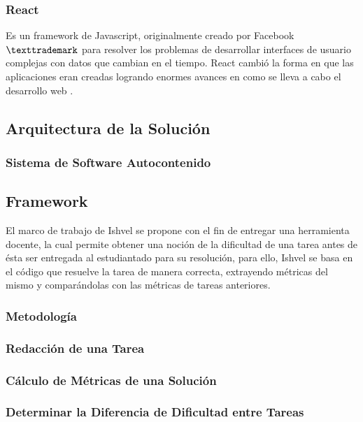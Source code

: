 \documentclass[letterpaper,12pt]{article}
\begin{document}
\subsubsection{React}

Es un framework de Javascript, originalmente creado por Facebook$\texttrademark$ para resolver los problemas de desarrollar interfaces de usuario complejas con datos que cambian en el tiempo. React cambió la forma en que las aplicaciones eran creadas logrando enormes avances en como se lleva a cabo el desarrollo web \cite{Gackenheimer2015}.

\subsection{Arquitectura de la Solución}

\subsubsection{Sistema de Software Autocontenido}

\subsection{Framework}

El marco de trabajo de Ishvel se propone con el fin de entregar una herramienta docente, la cual permite obtener una noción de la dificultad de una tarea antes de ésta ser entregada al estudiantado para su resolución, para ello, Ishvel se basa en el código que resuelve la tarea de manera correcta, extrayendo métricas del mismo y comparándolas con las métricas de tareas anteriores.

\subsubsection{Metodología}



\subsubsection{Redacción de una Tarea}
\subsubsection{Cálculo de Métricas de una Solución}



\subsubsection{Determinar la Diferencia de Dificultad entre Tareas}
\end{document}

